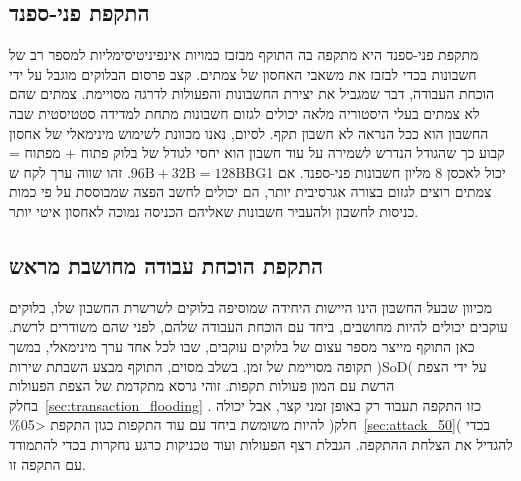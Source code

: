 \subsection{התקפת פני-ספנד}
מתקפת פני-ספנד היא מתקפה בה התוקף מבזבז כמויות אינפיניטיסימליות למספר רב של חשבונות בכדי לבזבז את משאבי האחסון של צמתים. קצב פרסום הבלוקים מוגבל על ידי הוכחת העבודה, דבר שמגביל את יצירת החשבונות והפעולות לדרגה מסויימת. צמתים שהם לא צמתים בעלי היסטוריה מלאה יכולים לגזום חשבונות מתחת למדידה סטטיסטית שבה החשבון הוא ככל הנראה לא חשבון תקף. לסיום, נאנו מכוונת לשימוש מינימאלי של אחסון קבוע כך שהגודל הנדרש לשמירה על עוד חשבון הוא יחסי לגודל של בלוק פתוח + מפתוח = $ 96\text{B} + 32\text{B} = 128\text{B}$. זהו שווה ערך לקח שBG1  יכול לאכסן 8 מליון חשבונות פני-ספנד. אם צמתים רוצים לגזום בצורה אגרסיבית יותר, הם יכולים לחשב הפצה שמבוססת על פי כמות כניסות לחשבון ולהעביר חשבונות שאליהם הכניסה נמוכה לאחסון איטי יותר.


\subsection{התקפת הוכחת עבודה מחושבת מראש}
מכיוון שבעל החשבון הינו היישות היחידה שמוסיפה בלוקים לשרשרת החשבון שלו, בלוקים עוקבים יכולים להיות מחושבים, ביחד עם הוכחת העבודה שלהם, לפני שהם משודרים לרשת. כאן התוקף מייצר מספר עצום של בלוקים עוקבים, שבו לכל אחד ערך מינימאלי, במשך תקופה מסויימת של זמן. בשלב מסוים, התוקף מבצע השבתת שירות )SoD( על ידי הצפת הרשת עם המון פעולות תקפות. זוהי גרסא מתקדמת של הצפת הפעולות בחלק~\ref{sec:transaction_flooding}
. כזו התקפה תעבוד רק באופן זמני קצר, אבל יכולה להיות משומשת ביחד עם עוד התקפות כגון התקפת \textless \%05 )חלק~\ref{sec:attack_50}( בכדי להגדיל את הצלחת ההתקפה. הגבלת רצף הפעולות ועוד טכניקות כרגע נחקרות בכדי להתמודד עם התקפה
זו.


